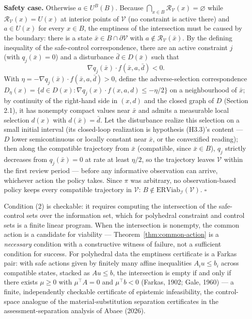 \documentclass[11pt]{article}
\theoremstyle{definition}
\begin{document}
\textbf{Safety case.} Otherwise \(a \in U^B(B)\). Because
\(\bigcap_{x \in B} \mathcal{R}_{\mathcal{V}}(x) = \varnothing\) while
\(\mathcal{R}_{\mathcal{V}}(x) = U(x)\) at interior points of
\(\mathcal{V}\) (no constraint is active there) and \(a \in U(x)\) for
every \(x \in B\), the emptiness of the intersection must be caused by
the boundary: there is a state
\(\bar x \in B \cap \partial \mathcal{V}\) with
\(a \notin \mathcal{R}_{\mathcal{V}}(\bar x)\). By the defining
inequality of the safe-control correspondence, there are an active
constraint \(j\) (with \(q_j(\bar x) = 0\)) and a disturbance
\(\bar d \in D(\bar x)\) such that
\[\nabla q_j(\bar x) \cdot f(\bar x, a, \bar d) < 0.\] With
\(\eta = - \nabla q_j(\bar x) \cdot f(\bar x, a, \bar d) > 0\), define
the adverse-selection correspondence
\(D_{\eta}(x) = \{ d \in D(x) : \nabla q_j(x) \cdot f(x, a, d) \le -\eta/2 \}\)
on a neighbourhood of \(\bar x\); by continuity of the right-hand side
in \((x,d)\) and the closed graph of \(D\) (Section 2.1), it has
nonempty compact values near \(\bar x\) and admits a measurable local
selection \(d(x)\) with \(d(\bar x) = \bar d\). Let the disturbance
realize this selection on a small initial interval (its closed-loop
realization is hypothesis (H3.3)'s content --- \(D\) lower
semicontinuous or locally constant near \(\bar x\), or the convexified
reading); then along the compatible trajectory from \(\bar x\)
(compatible, since \(\bar x \in B\)), \(q_j\) strictly decreases from
\(q_j(\bar x) = 0\) at rate at least \(\eta/2\), so the trajectory
leaves \(\mathcal{V}\) within the first review period --- before any
informative observation can arrive, whichever action the policy takes.
Since \(\pi\) was arbitrary, no observation-based policy keeps every
compatible trajectory in \(\mathcal{V}\):
\(B \notin \mathrm{ERViab}_{\mathcal{I}}(\mathcal{V})\). \ensuremath{\square}

Condition (2) is checkable: it requires computing the intersection of
the safe-control sets over the information set, which for polyhedral
constraint and control sets is a finite linear program. When the
intersection is nonempty, the common action is a candidate for viability
--- Theorem~\ref{thm:common-action} is a \emph{necessary} condition with a constructive
witness of failure, not a sufficient condition for success. For
polyhedral data the emptiness certificate is a Farkas pair: with safe
actions given by finitely many affine inequalities \(A_i u \le b_i\)
across compatible states, stacked as \(A u \le b\), the intersection is
empty if and only if there exists \(\mu \ge 0\) with \(\mu^{\top} A = 0\) and \(\mu^{\top} b < 0\) (Farkas, 1902;
Gale, 1960) --- a finite, independently checkable certificate of
epistemic infeasibility, the control-space analogue of the material-substitution separation certificates in the assessment-separation analysis of Abaee (2026).
\end{document}
